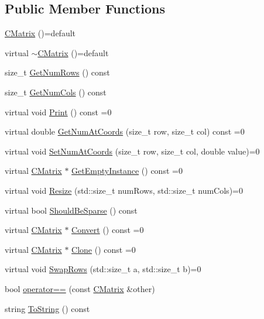 \subsection*{Public Member Functions}
\begin{DoxyCompactItemize}
\item 
\hyperlink{classCMatrix_ab91da59b03ce55dc412bc69578ecc855}{C\+Matrix} ()=default
\item 
virtual \hyperlink{classCMatrix_a0c4bbe807ddb1122065db4c3e3d6f964}{$\sim$\+C\+Matrix} ()=default
\item 
size\+\_\+t \hyperlink{classCMatrix_a08f758f9654f380b4c8d387fe53b99ed}{Get\+Num\+Rows} () const 
\item 
size\+\_\+t \hyperlink{classCMatrix_af3e74076e0ab9419860cb1c6d0841b96}{Get\+Num\+Cols} () const 
\item 
virtual void \hyperlink{classCMatrix_a424a048d20918f0f041f4a8645823ae7}{Print} () const =0
\item 
virtual double \hyperlink{classCMatrix_afa0213e0a6c5823e6b6e786891cc5f2d}{Get\+Num\+At\+Coords} (size\+\_\+t row, size\+\_\+t col) const =0
\item 
virtual void \hyperlink{classCMatrix_afeba0f7cfcc2623bde41cf6111b0ef6a}{Set\+Num\+At\+Coords} (size\+\_\+t row, size\+\_\+t col, double value)=0
\item 
virtual \hyperlink{classCMatrix}{C\+Matrix} $\ast$ \hyperlink{classCMatrix_a7495208c2bd786fe46b130f6090e7eb5}{Get\+Empty\+Instance} () const =0
\item 
virtual void \hyperlink{classCMatrix_adb83eafeeea2025f9c84d172f1bb0f1e}{Resize} (std\+::size\+\_\+t num\+Rows, std\+::size\+\_\+t num\+Cols)=0
\item 
virtual bool \hyperlink{classCMatrix_a3a3a7803344733bc8a421497097feeac}{Should\+Be\+Sparse} () const 
\item 
virtual \hyperlink{classCMatrix}{C\+Matrix} $\ast$ \hyperlink{classCMatrix_aca808472e6465738fae14a6ac244cf0b}{Convert} () const =0
\item 
virtual \hyperlink{classCMatrix}{C\+Matrix} $\ast$ \hyperlink{classCMatrix_a42ac1f2a9e69919974febca17971be60}{Clone} () const =0
\item 
virtual void \hyperlink{classCMatrix_aa9f96d82fa2e564f89f35a1781a12d69}{Swap\+Rows} (std\+::size\+\_\+t a, std\+::size\+\_\+t b)=0
\item 
bool \hyperlink{classCMatrix_a2f26b64fa654512fe2a4e954f18e1f1c}{operator==} (const \hyperlink{classCMatrix}{C\+Matrix} \&other)
\item 
string \hyperlink{classCMatrix_a4dc7e1a855fc44054a480fff050d393b}{To\+String} () const 
\end{DoxyCompactItemize}
